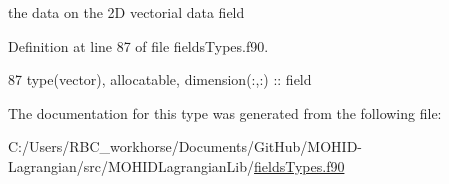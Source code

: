 the data on the 2D vectorial data field 



Definition at line 87 of file fields\+Types.\+f90.


\begin{DoxyCode}
87         \textcolor{keywordtype}{type}(vector), \textcolor{keywordtype}{allocatable}, \textcolor{keywordtype}{dimension(:,:)} :: field
\end{DoxyCode}


The documentation for this type was generated from the following file\+:\begin{DoxyCompactItemize}
\item 
C\+:/\+Users/\+R\+B\+C\+\_\+workhorse/\+Documents/\+Git\+Hub/\+M\+O\+H\+I\+D-\/\+Lagrangian/src/\+M\+O\+H\+I\+D\+Lagrangian\+Lib/\mbox{\hyperlink{fields_types_8f90}{fields\+Types.\+f90}}\end{DoxyCompactItemize}
